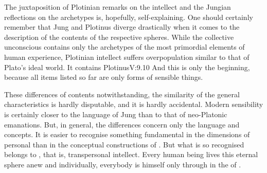 \pa The juxtaposition of Plotinian remarks on the intellect and the Jungian
reflections on the archetypes is, hopefully, self-explaining.  One 
should certainly remember that Jung and Plotinus diverge drastically when it
comes to the description of the contents of the respective spheres.  While the
collective unconscious contains only the archetypes of the most primordial
elements of human experience, Plotinian intellect suffers overpopulation similar
to that of Plato's ideal world. It contains \citet{qualities, accordant with
  Nature, and quantities; number and mass; origins and conditions; all actions
  and experiences not against nature; movement and repose, both the universals
  and the particulars: but There time is replaced by eternity and space by its
  intellectual equivalent, mutual inclusiveness.}{Plotinus}{V:9.10} And this is
only the beginning, because all items listed so far are only forms of sensible
things.

These differences of contents notwithstanding, the similarity of the general
characteristics is hardly disputable,
and it is hardly accidental.  Modern sensibility is certainly closer to the
language of Jung than to that of neo-Platonic emanations. But, in general, the
differences concern only the language and concepts. It is easier to recognise
something fundamental in the dimensions of personal  than in the
conceptual constructions of . But what is so recognised
belongs to , that is, transpersonal
intellect. Every human being lives this eternal sphere anew and individually,
everybody is himself only through  in the  of . 
  
